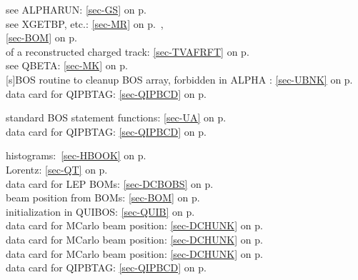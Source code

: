  see ALPHARUN: \ref{sec-GS} on p.~\pageref{sec-GS}\\
  see XGETBP, etc.: \ref{sec-MR} on
 p.~\pageref{sec-MR},\\
  \ref{sec-BOM} on p.~\pageref{sec-BOM}\\
 of a reconstructed charged track:
 \ref{sec-TVAFRFT} on p.~\pageref{sec-TVAFRFT}\\
 see QBETA: \ref{sec-MK} on p.~\pageref{sec-MK}\\
 [s]BOS routine to cleanup BOS array, forbidden in ALPHA :
 \ref{sec-UBNK} on p.~\pageref{sec-UBNK}\\
 data card for QIPBTAG: \ref{sec-QIPBCD} on p.~\pageref{sec-QIPBCD}
 
 standard BOS statement functions:  \ref{sec-UA} on p.~\pageref{sec-UA}\\
 data card for QIPBTAG: \ref{sec-QIPBCD} on p.~\pageref{sec-QIPBCD}
 
 histograms:~\ref{sec-HBOOK} on p.~\pageref{sec-HBOOK}\\
 Lorentz: \ref{sec-QT} on p.~\pageref{sec-QT}\\
 data card for LEP BOMs: \ref{sec-DCBOBS} on p.~\pageref{sec-DCBOBS}\\
 beam position from BOMs: \ref{sec-BOM} on p.~\pageref{sec-BOM}\\
 initialization in QUIBOS: \ref{sec-QUIB} on p.~\pageref{sec-QUIB}\\
 data card for MCarlo beam position: \ref{sec-DCHUNK} on p.~\pageref{sec-DCHUNK}\\
 data card for MCarlo beam position: \ref{sec-DCHUNK} on p.~\pageref{sec-DCHUNK}\\
 data card for MCarlo beam position: \ref{sec-DCHUNK} on p.~\pageref{sec-DCHUNK}\\
 data card for QIPBTAG: \ref{sec-QIPBCD} on p.~\pageref{sec-QIPBCD}
 

